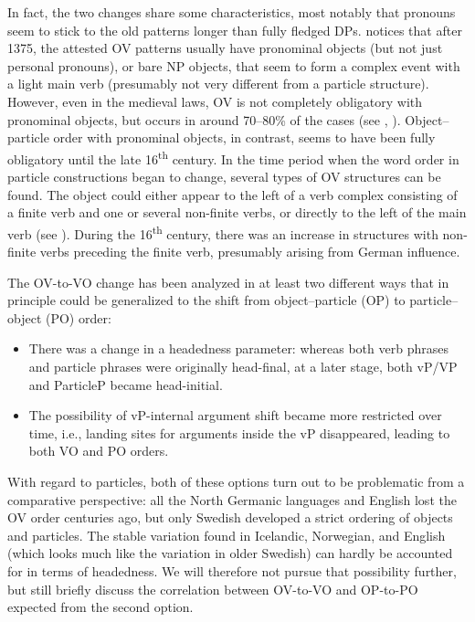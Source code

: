 \documentclass[output=paper]{langscibook}
\begin{document}
In fact, the two changes share some characteristics, most notably that pronouns seem to stick to the old patterns longer than fully fledged DPs. \citet[174]{Delsing1999} notices that after 1375, the attested OV patterns usually have pronominal objects (but not just personal pronouns), or bare NP objects, that seem to form a complex event with a light main verb (presumably not very different from a particle structure). However, even in the medieval laws, OV is not completely obligatory with pronominal objects, but occurs in around 70–80\% of the cases (see \citealt{Delsing1999}, ). Object–particle order with pronominal objects, in contrast, seems to have been fully obligatory until the late 16\textsuperscript{th} century. In the time period when the word order in particle constructions began to change, several types of OV structures can be found. The object could either appear to the left of a verb complex consisting of a finite verb and one or several non-finite verbs, or directly to the left of the main verb (see \citealt{Petzell2011, Petzell2012, Petzell2011}). During the 16\textsuperscript{th} century, there was an increase in structures with non-finite verbs preceding the finite verb, presumably arising from German influence.



The OV-to-VO change has been analyzed in at least two different ways that in principle could be generalized to the shift from object–particle (OP) to particle–object (PO) order: 


\begin{itemize}
\item There was a change in a headedness parameter: whereas both verb phrases and particle phrases were originally head-final, at a later stage, both vP/VP and ParticleP became head-initial.
\item The possibility of vP-internal argument shift became more restricted over time, i.e., landing sites for arguments inside the vP disappeared, leading to both VO and PO orders.
\end{itemize}

With regard to particles, both of these options turn out to be problematic from a comparative perspective: all the North Germanic languages and English lost the OV order centuries ago, but only Swedish developed a strict ordering of objects and particles. The stable variation found in Icelandic, Norwegian, and English (which looks much like the variation in older Swedish) can hardly be accounted for in terms of headedness. We will therefore not pursue that possibility further, but still briefly discuss the correlation between OV-to-VO and OP-to-PO expected from the second option.
\end{document}
